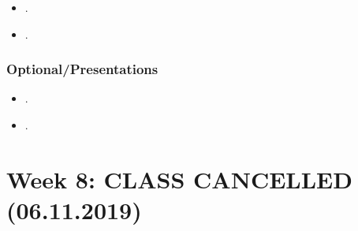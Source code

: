 \documentclass[abstract=on,parskip=full,headings=standardclasses,fontsize=11pt,paper=a4]{scrartcl}
\begin{document}
\begin{itemize}
\item {}.
\item {}.
\end{itemize}


\subsubsection*{Optional/Presentations}
\begin{itemize}
\item {}.
\item {}.
\end{itemize}

 
 

\section{Week 8:  CLASS CANCELLED (06.11.2019)}

\end{document}
